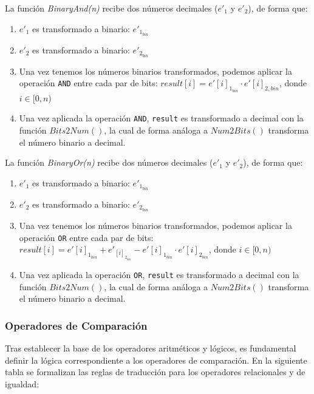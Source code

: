 \documentclass[a4paper,12pt]{report}
\begin{document}
	\vspace{0.2cm} 
	\noindent La función \textit{BinaryAnd(n)} recibe dos números decimales ($e'_1$ y $e'_2$), de forma que:
	
	\begin{enumerate}
		\item $e'_1$ es transformado a binario: $e'_{1_{bin}}$
		\item $e'_2$ es transformado a binario: $e'_{2_{bin}}$
		\item Una vez tenemos los números binarios transformados, podemos aplicar la operación \texttt{AND} entre cada par de bits: $result[i] = e'[i]_{1_{bin}} \cdot e'[i]_{2,{bin}}$, donde $i \in [0,n)$
		\item Una vez aplicada la operación \texttt{AND}, \texttt{result} es transformado a decimal con la función $Bits2Num()$, la cual de forma análoga a $Num2Bits()$ transforma el número binario a decimal.
	\end{enumerate}
	
	
	
	\noindent La función \textit{BinaryOr(n)} recibe dos números decimales ($e'_1$ y $e'_2$), de forma que:
	
	\begin{enumerate}
		\item $e'_1$ es transformado a binario: $e'_{1_{bin}}$
		\item $e'_2$ es transformado a binario: $e'_{2_{bin}}$
		\item Una vez tenemos los números binarios transformados, podemos aplicar la operación \texttt{OR} entre cada par de bits: $result[i] = e'[i]_{1_{bin}} + e'_[i]_{2_{bin}} - e'[i]_{1_{bin}} \cdot e'[i]_{2_{bin}}$, donde $i \in [0,n)$
		\item Una vez aplicada la operación \texttt{OR}, \texttt{result} es transformado a decimal con la función $Bits2Num()$, la cual de forma análoga a $Num2Bits()$ transforma el número binario a decimal.
	\end{enumerate}
	
	
	\subsubsection{Operadores de Comparación}
	\noindent Tras establecer la base de los operadores aritméticos y lógicos, es fundamental definir la lógica correspondiente a los operadores de comparación. En la siguiente tabla se formalizan las reglas de traducción para los operadores relacionales y de igualdad:
	
\end{document}

